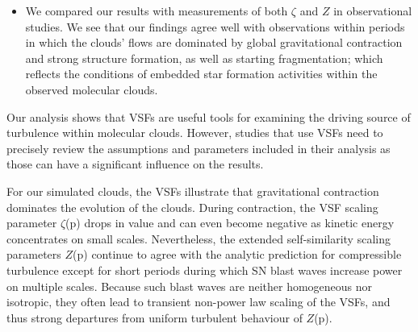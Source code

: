\begin{itemize}
\item We compared our results with measurements of both $\zeta$ and $Z$ in observational studies. We see that our findings agree well with observations within periods in which the clouds' flows are dominated by global gravitational contraction and strong structure formation, as well as starting fragmentation; which reflects the conditions of embedded star formation activities within the observed molecular clouds.
\end{itemize}

Our analysis shows that VSFs are useful tools for examining the driving source of turbulence within molecular clouds.
However, studies that use VSFs need to precisely review the assumptions and parameters included in their analysis as those can have a significant influence on the results.

For our simulated clouds, the VSFs illustrate that gravitational contraction dominates the evolution of the clouds.
During contraction, the VSF scaling parameter $\zeta$(p) drops in value and can even become negative as kinetic energy concentrates on small scales.
Nevertheless, the extended self-similarity scaling parameters $Z$(p) continue to agree with the analytic prediction for compressible turbulence except for short periods during which SN blast waves increase power on multiple scales.
Because such blast waves are neither homogeneous nor isotropic, they often lead to transient non-power law scaling of the VSFs, and thus strong departures from uniform turbulent behaviour of $Z$(p).



\endinput
